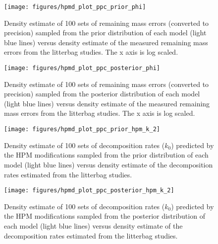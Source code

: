 \documentclass[
  12pt,
]{article}
\begin{document}
\begin{figure}[H]

{\centering \texttt{[image: figures/hpmd\_plot\_ppc\_prior\_phi]} 

}

\caption{Density estimate of 100 sets of remaining mass errors (converted to precision) sampled from the prior distribution of each model (light blue lines) versus density estimate of the measured remaining mass errors from the litterbag studies. The x axis is log scaled.}\label{fig:sup-hpmd-plot-ppc-prior-phi}
\end{figure}



\begin{figure}[H]

{\centering \texttt{[image: figures/hpmd\_plot\_ppc\_posterior\_phi]} 

}

\caption{Density estimate of 100 sets of remaining mass errors (converted to precision) sampled from the posterior distribution of each model (light blue lines) versus density estimate of the measured remaining mass errors from the litterbag studies. The x axis is log scaled.}\label{fig:sup-hpmd-plot-ppc-posterior-phi}
\end{figure}



\begin{figure}[H]

{\centering \texttt{[image: figures/hpmd\_plot\_ppc\_prior\_hpm\_k\_2]} 

}

\caption{Density estimate of 100 sets of decomposition rates (\(k_0\)) predicted by the HPM modifications sampled from the prior distribution of each model (light blue lines) versus density estimate of the decomposition rates estimated from the litterbag studies.}\label{fig:sup-hpmd-plot-ppc-prior-hpm-k-2}
\end{figure}



\begin{figure}[H]

{\centering \texttt{[image: figures/hpmd\_plot\_ppc\_posterior\_hpm\_k\_2]} 

}

\caption{Density estimate of 100 sets of decomposition rates (\(k_0\)) predicted by the HPM modifications sampled from the posterior distribution of each model (light blue lines) versus density estimate of the decomposition rates estimated from the litterbag studies.}\label{fig:sup-hpmd-plot-ppc-posterior-hpm-k-2}
\end{figure}
\end{document}
